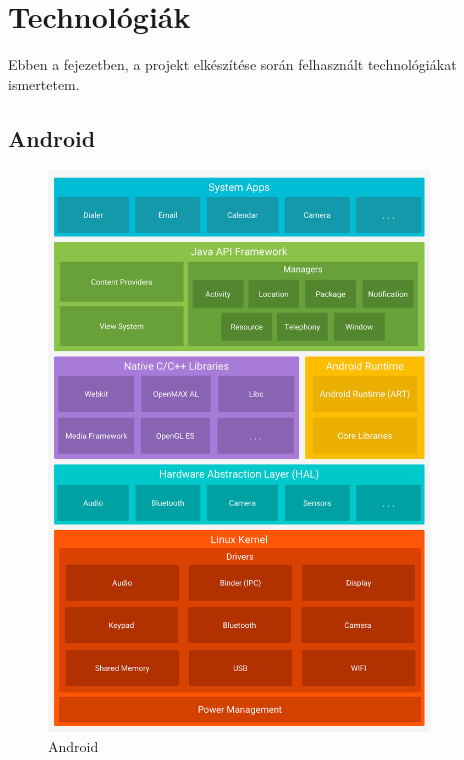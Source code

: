 \chapter{Technológiák}

\begin{osszefoglal}
	Ebben a fejezetben, a projekt elkészítése során felhasznált technológiákat ismertetem.
	
\end{osszefoglal}

\section{Android}

\begin{figure}
	\centering
	\setlength{\abovecaptionskip}{0pt}
	\setlength{\belowcaptionskip}{0pt}
	\includegraphics[width=0.9\textwidth, scale=0.9]{images/android}
	\caption{Android\label{fig:ALAP:sm2}}
\end{figure}

